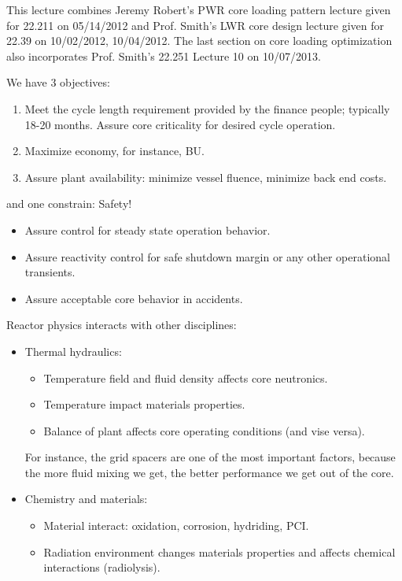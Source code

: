\documentclass{school-22.211-notes}
\date{May 14, 2012}
\begin{document}
\maketitle


This lecture combines Jeremy Robert's PWR core loading pattern lecture
given for 22.211 on 05/14/2012 and Prof. Smith's LWR core design
lecture given for 22.39 on 10/02/2012, 10/04/2012. The last section on
core loading optimization also incorporates Prof. Smith's 22.251
Lecture 10 on 10/07/2013.

We have 3 objectives:
\begin{enumerate}
\item Meet the cycle length requirement provided by the finance people; typically 18-20 months. Assure core criticality for desired cycle operation. 
\item Maximize economy, for instance, BU. 
\item Assure plant availability: minimize vessel fluence, minimize back end costs. 
\end{enumerate}
and one constrain: Safety!
  \begin{itemize}
    \item Assure control for steady state operation behavior. 
    \item Assure reactivity control for safe shutdown margin or any other operational transients. 
    \item Assure acceptable core behavior in accidents. 
  \end{itemize}
Reactor physics interacts with other disciplines: 
\begin{itemize}
\item Thermal hydraulics: 
  \begin{itemize}
  \item Temperature field and fluid density affects core neutronics. 
  \item Temperature impact materials properties. 
  \item Balance of plant affects core operating conditions (and vise versa). 
  \end{itemize}
  For instance, the grid spacers are one of the most important factors, because the more fluid mixing we get, the better performance we get out of the core. 

\item Chemistry and materials: 
  \begin{itemize}
    \item Material interact: oxidation, corrosion, hydriding, PCI.
    \item Radiation environment changes materials properties and affects chemical interactions (radiolysis). 
  \end{itemize}
\end{itemize}
\end{document}

